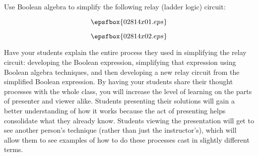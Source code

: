 

Use Boolean algebra to simplify the following relay (ladder logic) circuit:

$$\epsfbox{02814x01.eps}$$







$$\epsfbox{02814x02.eps}$$







Have your students explain the entire process they used in simplifying the relay circuit: developing the Boolean expression, simplifying that expression using Boolean algebra techniques, and then developing a new relay circuit from the simplified Boolean expression.  By having your students share their thought processes with the whole class, you will increase the level of learning on the parts of presenter and viewer alike.  Students presenting their solutions will gain a better understanding of how it works because the act of presenting helps consolidate what they already know.  Students viewing the presentation will get to see another person's technique (rather than just the instructor's), which will allow them to see examples of how to do these processes cast in slightly different terms.




